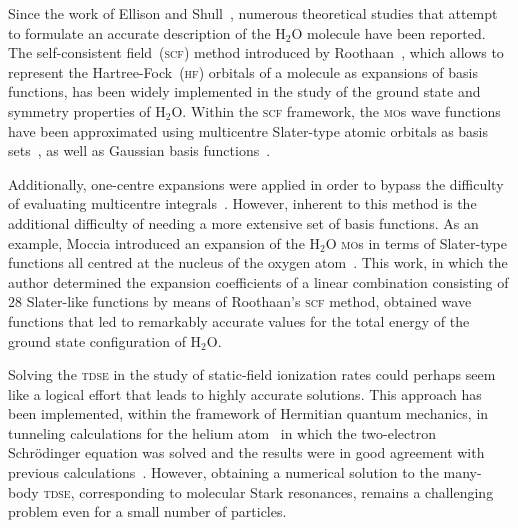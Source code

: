

Since the work of Ellison and Shull~\cite{EllisonShullh2o_1955},
numerous theoretical studies that attempt to formulate an accurate
description of the H$_{2}$O molecule have been reported. The
self-consistent field~(\textsc{scf}) method introduced by
Roothaan~\cite{Roothaan_1951}, which allows to represent the
Hartree-Fock~(\textsc{hf}) orbitals of a molecule as expansions of
basis functions, has been widely implemented in the study of the
ground state and symmetry properties of H$_{2}$O. Within the
\textsc{scf} framework, the \textsc{mo}s wave functions have
been approximated using multicentre Slater-type atomic orbitals as
basis
sets~\cite{Reeves_nature_1956,natureH2O_1960,Pitzer_1968,Pitzer_1970},
as well as Gaussian basis
functions~\cite{gaussianH2O_1965,Neumann_gaussian_1968}.

Additionally, one-centre expansions were applied in order to bypass
the difficulty of evaluating multicentre
integrals~\cite{Moccia_1964,oneCentre_1961,Parr_JCP_1960}. However,
inherent to this method is the additional difficulty of needing a more
extensive set of basis functions. As an example, Moccia introduced an
expansion of the H$_{2}$O \textsc{mo}s in terms of Slater-type
functions all centred at the nucleus of the oxygen
atom~\cite{Moccia_1964}. This work, in which the author determined the
expansion coefficients of a linear combination consisting of $28$
Slater-like functions by means of Roothaan's \textsc{scf} method,
obtained wave functions that led to remarkably accurate values for the
total energy of the ground state configuration of H$_{2}$O.


Solving the \textsc{tdse} in the study of static-field ionization
rates could perhaps seem like a logical effort that leads to highly
accurate solutions. This approach has been implemented, within the
framework of Hermitian quantum mechanics, in tunneling calculations
for the helium atom~\cite{static_tdse_He,static_tdse_He_method} in
which the two-electron Schr\"{o}dinger equation was solved and the
results were in good agreement with previous
calculations~\cite{static_He_scrinzi}. However, obtaining a numerical
solution to the many-body \textsc{tdse}, corresponding to molecular
Stark resonances, remains a challenging problem even for a small
number of particles.

